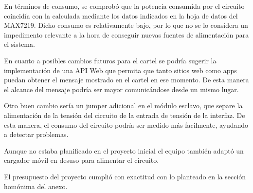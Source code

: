 En términos de consumo, se comprobó que la potencia consumida por el circuito coincidía con la calculada mediante los datos indicados en la hoja de datos del MAX7219. Dicho consumo es relativamente bajo, por lo que no se lo considera un impedimento relevante a la hora de conseguir nuevas fuentes de alimentación para el sistema. 

En cuanto a posibles cambios futuros para el cartel se podría sugerir la implementación de una API Web que permita que tanto sitios web como apps puedan obtener el mensaje mostrado en el cartel en ese momento. De esta manera el alcance del mensaje podría ser mayor comunicándose desde un mismo lugar.

Otro buen cambio sería un jumper adicional en el módulo esclavo, que separe la alimentación de la tensión del circuito de la entrada de tensión de la interfaz. De esta manera, el consumo del circuito podría ser medido más facilmente, ayudando a detectar problemas.

Aunque no estaba planificado en el proyecto inicial el equipo también adaptó un cargador móvil en desuso para alimentar el circuito.

El presupuesto del proyecto cumplió con exactitud con lo planteado en la sección homónima del anexo.

